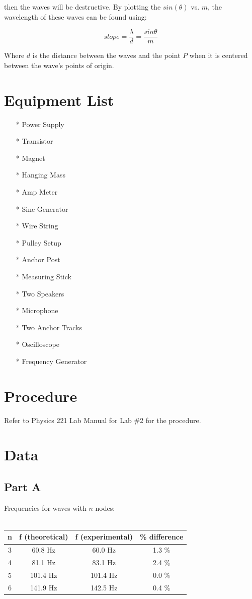 \documentclass[titlepage]{article}
\begin{document}
then the waves will be destructive. By plotting the $sin(\theta)$ vs. $m$, the wavelength of these waves can be found using:

\begin{equation}
	slope = \frac{\lambda}{d} = \frac{sin \theta}{m}
\end{equation}

Where $d$ is the distance between the waves and the point $P$ when it is centered between the wave's points of origin.

\section{Equipment List}\label{sec:equipment_list}
\begin{itemize}
\item[*] Power Supply
\item[*] Transistor
\item[*] Magnet
\item[*] Hanging Mass
\item[*] Amp Meter
\item[*] Sine Generator
\item[*] Wire String
\item[*] Pulley Setup
\item[*] Anchor Post
\item[*] Measuring Stick
\item[*] Two Speakers
\item[*] Microphone
\item[*] Two Anchor Tracks
\item[*] Oscilloscope
\item[*] Frequency Generator
\end{itemize}

\section{Procedure}\label{sec:procedure}
Refer to Physics 221 Lab Manual for Lab \#2 for the procedure.

\section{Data}\label{sec:data}
\subsection{Part A}\label{sub:part_a}

Frequencies for waves with $n$ nodes:\\
\\
\begin{tabular}{cccc}
\hline
n & f (theoretical) & f (experimental) & \% difference\\
\hline
3 & 60.8 Hz & 60.0 Hz & 1.3 \%\\
\hline
4 & 81.1 Hz & 83.1 Hz & 2.4 \%\\
\hline
5 & 101.4 Hz & 101.4 Hz & 0.0 \%\\
\hline
6 & 141.9 Hz & 142.5 Hz & 0.4 \%\\
\hline
\end{tabular}
\end{document}
